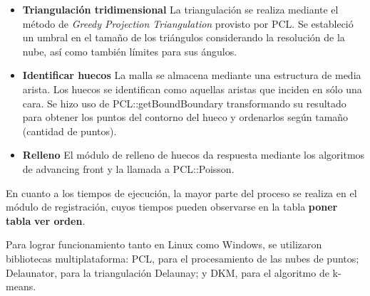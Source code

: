 \documentclass{pfc}
\newcommand{\Alerta}[1]{{\Huge\bfseries\sffamily#1}}
\newcommand{\NombreItem}[1]{{\bfseries#1}}
\begin{document}
\begin{itemize}
			\item  \NombreItem{Triangulación tridimensional}
				La triangulación se realiza mediante el método de \emph{Greedy
				Projection Triangulation} provisto por PCL.
				Se estableció un umbral en el tamaño de los triángulos considerando la resolución de la nube,
				así como también límites para sus ángulos.

			\item  \NombreItem{Identificar huecos}
				La malla se almacena mediante una estructura de media arista. Los
				huecos se identifican como aquellas aristas que inciden en sólo una
				cara.
				Se hizo uso de PCL::getBoundBoundary transformando su resultado para
				obtener los puntos del contorno del hueco y ordenarlos según tamaño
				(cantidad de puntos).

			\item  \NombreItem{Relleno}
				El módulo de relleno de huecos da respuesta mediante los algoritmos de advancing front y
				la llamada a PCL::Poisson.
		\end{itemize}


		En cuanto a  los tiempos de ejecución,
		la mayor parte del proceso se realiza en
		el módulo de registración, cuyos tiempos
		pueden observarse en la tabla \Alerta{poner tabla} \Alerta{ver orden}.

		Para lograr funcionamiento tanto en Linux como Windows,
		se utilizaron bibliotecas multiplataforma:
		PCL, para el procesamiento de las nubes de puntos;
		Delaunator, para la triangulación Delaunay;
		y DKM, para el algoritmo de k-means.


	
	
\end{document}
